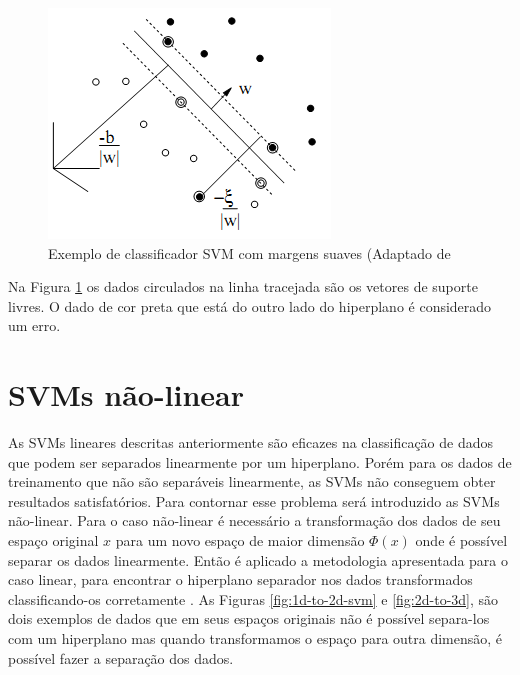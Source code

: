 \begin{figure}[htb]
	\centering
	\includegraphics[scale=0.9]{./figuras/margem_svm_suave.png}
	\caption{Exemplo de classificador SVM com margens suaves (Adaptado de \cite{Burges1998Support}}
	\label{fig:margem_svm_suave}
\end{figure}

Na Figura \ref{fig:margem_svm_suave} os dados circulados na linha tracejada são os vetores de suporte livres. O dado de cor preta que está do outro lado do hiperplano é considerado um erro. 

\section{SVMs não-linear}\label{cap:svm:svm-nl}

As SVMs lineares descritas anteriormente são eficazes na classificação de dados que podem ser separados linearmente por um hiperplano. Porém para os dados de treinamento que não são separáveis linearmente, as SVMs não conseguem obter resultados satisfatórios. Para contornar esse problema será introduzido as SVMs não-linear. Para o caso não-linear é necessário a transformação dos dados de seu espaço original $x$ para um novo espaço de maior dimensão $\Phi(x)$ onde é possível separar os dados linearmente. Então é aplicado a metodologia apresentada para o caso linear, para encontrar o hiperplano separador nos dados transformados classificando-os corretamente \cite{Steinbach2005}. As Figuras \ref{fig:1d-to-2d-svm} e \ref{fig:2d-to-3d}, são dois exemplos de dados que em seus espaços originais não é possível separa-los com um hiperplano mas quando transformamos o espaço para outra dimensão, é possível fazer a separação dos dados.

